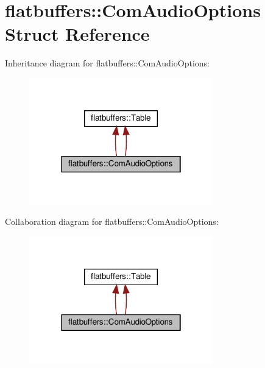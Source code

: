 \hypertarget{structflatbuffers_1_1ComAudioOptions}{}\section{flatbuffers\+:\+:Com\+Audio\+Options Struct Reference}
\label{structflatbuffers_1_1ComAudioOptions}


Inheritance diagram for flatbuffers\+:\+:Com\+Audio\+Options\+:
\nopagebreak
\begin{figure}[H]
\begin{center}
\leavevmode
\includegraphics[width=226pt]{structflatbuffers_1_1ComAudioOptions__inherit__graph}
\end{center}
\end{figure}


Collaboration diagram for flatbuffers\+:\+:Com\+Audio\+Options\+:
\nopagebreak
\begin{figure}[H]
\begin{center}
\leavevmode
\includegraphics[width=226pt]{structflatbuffers_1_1ComAudioOptions__coll__graph}
\end{center}
\end{figure}
